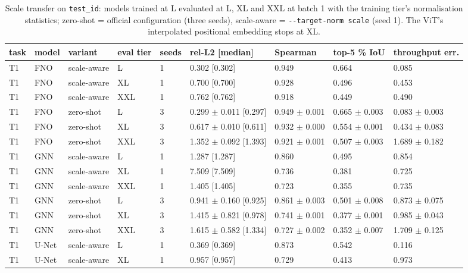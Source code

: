 \begin{table}[tb]
\centering
\scriptsize
\setlength{\tabcolsep}{3.5pt}
\caption{Scale transfer on \texttt{test\_id}: models trained at L evaluated at L, XL and XXL at batch 1 with the training tier's normalisation statistics; zero-shot = official configuration (three seeds), scale-aware = \texttt{-{}-target-norm scale} (seed 1). The ViT's interpolated positional embedding stops at XL.}
\label{tab:scale_transfer}
\setlength{\tabcolsep}{2.2pt}
\begin{tabular}{lllllllll}
\toprule
task & model & variant & eval tier & seeds & rel-L2 [median] & Spearman & top-5 \% IoU & throughput err. \\
\midrule
T1 & FNO & scale-aware & L & 1 & 0.302 [0.302] & 0.949 & 0.664 & 0.085 \\
T1 & FNO & scale-aware & XL & 1 & 0.700 [0.700] & 0.928 & 0.496 & 0.453 \\
T1 & FNO & scale-aware & XXL & 1 & 0.762 [0.762] & 0.918 & 0.449 & 0.490 \\
T1 & FNO & zero-shot & L & 3 & 0.299 $\pm$ 0.011 [0.297] & 0.949 $\pm$ 0.001 & 0.665 $\pm$ 0.003 & 0.083 $\pm$ 0.003 \\
T1 & FNO & zero-shot & XL & 3 & 0.617 $\pm$ 0.010 [0.611] & 0.932 $\pm$ 0.000 & 0.554 $\pm$ 0.001 & 0.434 $\pm$ 0.083 \\
T1 & FNO & zero-shot & XXL & 3 & 1.352 $\pm$ 0.092 [1.393] & 0.921 $\pm$ 0.001 & 0.507 $\pm$ 0.003 & 1.689 $\pm$ 0.182 \\
T1 & GNN & scale-aware & L & 1 & 1.287 [1.287] & 0.860 & 0.495 & 0.854 \\
T1 & GNN & scale-aware & XL & 1 & 7.509 [7.509] & 0.736 & 0.381 & 0.725 \\
T1 & GNN & scale-aware & XXL & 1 & 1.405 [1.405] & 0.723 & 0.355 & 0.735 \\
T1 & GNN & zero-shot & L & 3 & 0.941 $\pm$ 0.160 [0.925] & 0.861 $\pm$ 0.003 & 0.501 $\pm$ 0.008 & 0.873 $\pm$ 0.075 \\
T1 & GNN & zero-shot & XL & 3 & 1.415 $\pm$ 0.821 [0.978] & 0.741 $\pm$ 0.001 & 0.377 $\pm$ 0.001 & 0.985 $\pm$ 0.043 \\
T1 & GNN & zero-shot & XXL & 3 & 1.615 $\pm$ 0.582 [1.334] & 0.727 $\pm$ 0.002 & 0.352 $\pm$ 0.007 & 1.709 $\pm$ 0.125 \\
T1 & U-Net & scale-aware & L & 1 & 0.369 [0.369] & 0.873 & 0.542 & 0.116 \\
T1 & U-Net & scale-aware & XL & 1 & 0.957 [0.957] & 0.729 & 0.413 & 0.973 \\

\end{tabular}
\end{table}
